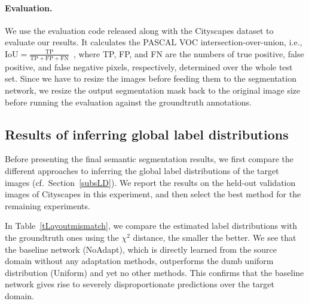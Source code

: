 \paragraph{Evaluation.} We use the evaluation code released along with the Cityscapes dataset to evaluate our results. It calculates the PASCAL VOC intersection-over-union, i.e., 
$\text{IoU}=\frac{\text{TP}}{\text{TP}+\text{FP}+\text{FN}}$~\cite{everingham_pascal_2015}, where  TP, FP, and FN are the numbers of true positive, false positive, and false
negative pixels, respectively, determined over the whole test set. Since we have to resize the images before feeding them to the segmentation network, we resize the output segmentation mask back to the original image size before running the evaluation against the groundtruth annotations.









\begin{table}
\centering
\caption{The $\chi^2$ distances between the groundtruth label distributions and those predicted by different methods.}
\label{tLayoutmismatch}
\vspace{-15pt}
\end{table}

\subsection{Results of inferring global label distributions}
Before presenting the final semantic segmentation results, we first compare the different approaches to inferring the global label distributions of the target images (cf.\ Section~\ref{subsLD}). We report the results on the held-out validation images of Cityscapes in this experiment, and then select the best method for the remaining experiments. 

In Table~\ref{tLayoutmismatch}, we compare the estimated label distributions with the groundtruth ones using the $\chi^2$ distance, the smaller the better. We see that the baseline network (NoAdapt), which is directly learned from the source domain without any adaptation methods, outperforms the dumb uniform distribution (Uniform) and yet no other methods. This confirms that the baseline network gives rise to severely disproportionate predictions over the target domain. 

